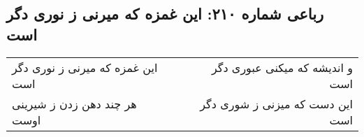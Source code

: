 \begin{center}
\section*{رباعی شماره ۲۱۰: این غمزه که میرنی ز نوری دگر است}
\label{sec:0210}
\begin{longtable}{l p{0.5cm} r}
این غمزه که میرنی ز نوری دگر است
&&
و اندیشه که میکنی عبوری دگر است
\\
هر چند دهن زدن ز شیرینی اوست
&&
این دست که میزنی ز شوری دگر است
\\
\end{longtable}
\end{center}
